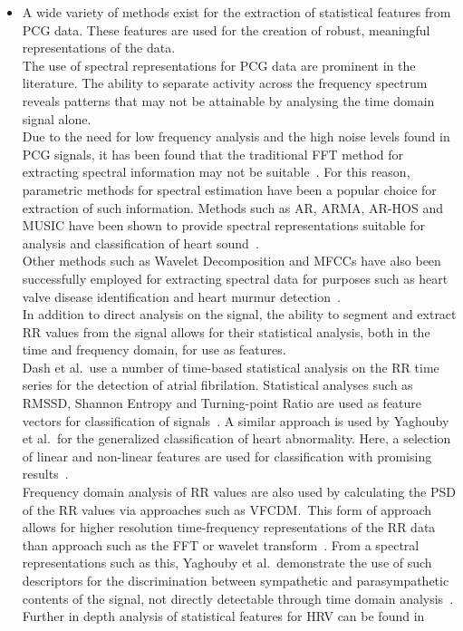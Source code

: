 \documentclass[titlepage]{scrartcl}
\begin{document}
\begin{itemize}
    \item A wide variety of methods exist for the extraction of statistical
        features from PCG data. These features are used for the creation of
        robust, meaningful representations of the data.\\
        The use of spectral representations for PCG data are prominent in the
        literature. The ability to separate activity across the frequency
        spectrum reveals patterns that may not be attainable by analysing the
        time domain signal alone.\\
        Due to the need for low frequency analysis and the high noise levels
        found in PCG signals, it has been found that the traditional FFT
        method for extracting spectral information may not be
        suitable~\parencite{Akay1990}. For this reason, parametric methods for
        spectral estimation have been a popular choice for extraction of such information. 
        Methods such as AR, ARMA, AR-HOS and MUSIC have been shown to provide spectral
        representations suitable for analysis and classification of heart
        sound~\parencite{Ergen2001, Schmidt2015}.\\
        Other methods such as Wavelet Decomposition and MFCCs have also been
        successfully  employed for extracting spectral data for purposes such
        as heart valve disease identification and heart murmur
        detection~\parencite{Quiceno-Manrique2010a, Maglogiannis2009}.\\
        
        In addition to direct analysis on the signal, the ability to segment
        and extract RR values from the signal allows for their statistical
        analysis, both in the time and frequency domain, for use as features.\\
        Dash et al.\ use a number of time-based statistical analysis on the RR
        time series for the detection of atrial fibrilation. Statistical
        analyses such as RMSSD, Shannon Entropy and Turning-point Ratio are
        used as feature vectors for classification of
        signals~\citeyearpar{Dash2009}.  A similar approach is used by Yaghouby
        et al.\ for the generalized classification of heart abnormality. Here,
        a selection of linear and non-linear features are used for
        classification with promising results~\citeyearpar{Yaghouby2009}.\\
        Frequency domain analysis of RR values are also used by calculating the
        PSD of the RR values via  approaches such as VFCDM.\ This form of
        approach allows for higher resolution time-frequency representations of
        the RR data than approach such as the FFT or wavelet transform~\parencite{Wang2006}.
        From a spectral representations such as this, Yaghouby et al.\
        demonstrate the use of such descriptors for the discrimination between
        sympathetic and parasympathetic contents of the signal, not directly
        detectable through time domain analysis~\citeyearpar{Yaghouby2009}.\\
        Further in depth analysis of statistical features for HRV can be found
        in~\parencite{Electrophysiology1996}


\end{itemize}
\end{document}
